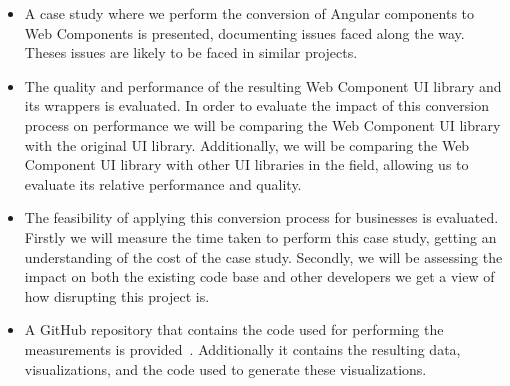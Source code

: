 \begin{itemize}
	\item A case study where we perform the conversion of Angular components to Web Components is presented, documenting issues faced along the way. Theses issues are likely to be faced in similar projects.
	\item The quality and performance of the resulting Web Component UI library and its wrappers is evaluated. In order to evaluate the impact of this conversion process on performance we will be comparing the Web Component UI library with the original UI library. Additionally, we will be comparing the Web Component UI library with other UI libraries in the field, allowing us to evaluate its relative performance and quality.
	\item The feasibility of applying this conversion process for businesses is evaluated. Firstly we will measure the time taken to perform this case study, getting an understanding of the cost of the case study. Secondly, we will be assessing the impact on both the existing code base and other developers we get a view of how disrupting this project is.
	\item A GitHub repository that contains the code used for performing the measurements is provided~. Additionally it contains the resulting data, visualizations, and the code used to generate these visualizations.
\end{itemize}